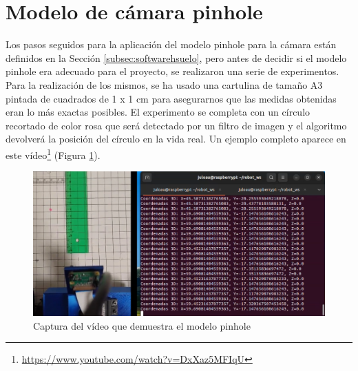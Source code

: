 \section{Modelo de cámara pinhole}
\label{sec:expmodelopinhole}

Los pasos seguidos para la aplicación del modelo pinhole para la cámara están definidos en la Sección \ref{subsec:softwarehsuelo}, pero antes de decidir si el modelo pinhole era adecuado para el proyecto, se realizaron una serie de experimentos. Para la realización de los mismos, se ha usado una cartulina de tamaño A3 pintada de cuadrados de 1 x 1 cm para asegurarnos que las medidas obtenidas eran lo más exactas posibles. El experimento se completa con un círculo recortado de color rosa que será detectado por un filtro de imagen y el algoritmo devolverá la posición del círculo en la vida real. Un ejemplo completo aparece en este vídeo\footnote{\url{https://www.youtube.com/watch?v=DxXaz5MFIqU}} (Figura \ref{fig:exppinhole}).



\begin{figure} [h!]
	\begin{center}
			\includegraphics[width=15cm]{figs/cap7/exppinhole.png}
		\end{center}
	\caption{Captura del vídeo que demuestra el modelo pinhole}
	\label{fig:exppinhole}
\end{figure}


